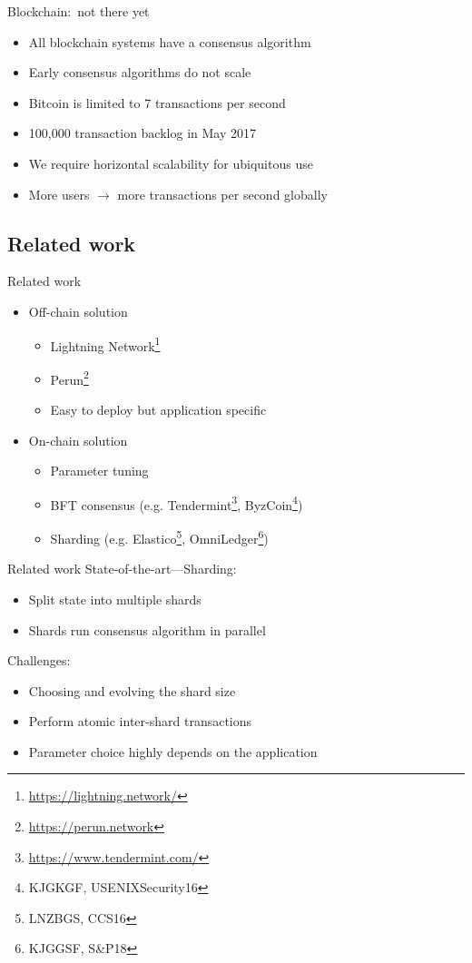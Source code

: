\documentclass{beamer}
\begin{document}
\begin{frame}{Blockchain:~not there yet}
  \begin{itemize}
    \item All blockchain systems have a consensus algorithm
    \item Early consensus algorithms do not scale
    \item Bitcoin is limited to 7 transactions per second
    \item 100,000 transaction backlog in May 2017
    \item We require horizontal scalability for ubiquitous use
    \item More users $\rightarrow$ more transactions per second globally
  \end{itemize}
\end{frame}

\subsection{Related work}
\begin{frame}{Related work}
    \begin{itemize}
        \item Off-chain solution
            \begin{itemize}
                \item Lightning Network\footnote{\url{https://lightning.network/}}
                \item Perun\footnote{\url{https://perun.network}}
                \item Easy to deploy but application specific
            \end{itemize}
        \item On-chain solution
            \begin{itemize}
                \item Parameter tuning
                \item BFT consensus (e.g. Tendermint\footnote{\url{https://www.tendermint.com/}}, ByzCoin\footnote{KJGKGF, USENIXSecurity16})
                \item Sharding (e.g. Elastico\footnote{LNZBGS, CCS16}, OmniLedger\footnote{KJGGSF, S\&P18})
            \end{itemize}
    \end{itemize}
\end{frame}

\begin{frame}{Related work}
  State-of-the-art---Sharding:
  \begin{itemize}
  \item Split state into multiple shards
  \item Shards run consensus algorithm in parallel
  \end{itemize}
  Challenges:
  \begin{itemize}
      \item Choosing and evolving the shard size
      \item Perform atomic inter-shard transactions
      \item Parameter choice highly depends on the application
  \end{itemize}
\end{frame}
\end{document}

